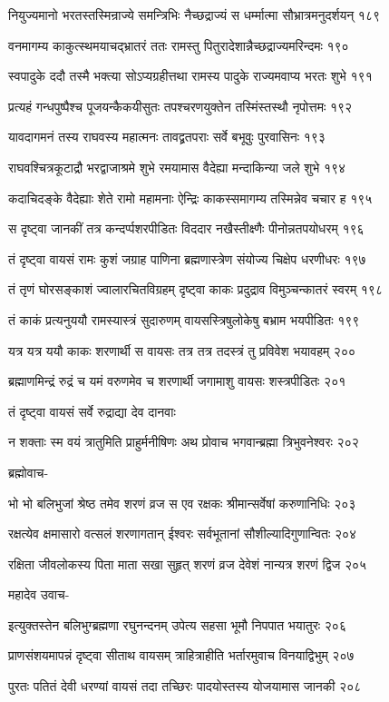 नियुज्यमानो भरतस्तस्मिन्राज्ये समन्त्रिभिः
नैच्छद्राज्यं स धर्म्मात्मा सौभ्रात्रमनुदर्शयन् १८९

वनमागम्य काकुत्स्थमयाचद्भ्रातरं ततः
रामस्तु पितुरादेशान्नैच्छद्राज्यमरिन्दमः १९०

स्वपादुके ददौ तस्मै भक्त्या सोऽप्यग्रहीत्तथा
रामस्य पादुके राज्यमवाप्य भरतः शुभे १९१

प्रत्यहं गन्धपुष्पैश्च पूजयन्कैकयीसुतः
तपश्चरणयुक्तेन तस्मिंस्तस्थौ नृपोत्तमः १९२

यावदागमनं तस्य राघवस्य महात्मनः
तावद्व्रतपराः सर्वे बभूवुः पुरवासिनः १९३

राघवश्चित्रकूटाद्रौ भरद्वाजाश्रमे शुभे
रमयामास वैदेह्या मन्दाकिन्या जले शुभे १९४

कदाचिदङ्के वैदेह्याः शेते रामो महामनाः
ऐन्द्रिः काकस्समागम्य तस्मिन्नेव चचार ह १९५

स दृष्ट्वा जानकीं तत्र कन्दर्प्पशरपीडितः
विददार नखैस्तीक्ष्णैः पीनोन्नतपयोधरम् १९६

तं दृष्ट्वा वायसं रामः कुशं जग्राह पाणिना
ब्रह्मणास्त्रेण संयोज्य चिक्षेप धरणीधरः १९७

तं तृणं घोरसङ्काशं ज्वालारचितविग्रहम्
दृष्ट्वा काकः प्रदुद्राव विमुञ्चन्कातरं स्वरम् १९८

तं काकं प्रत्यनुययौ रामस्यास्त्रं सुदारुणम्
वायसस्त्रिषुलोकेषु बभ्राम भयपीडितः १९९

यत्र यत्र ययौ काकः शरणार्थी स वायसः
तत्र तत्र तदस्त्रं तु प्रविवेश भयावहम् २००

ब्रह्माणमिन्द्रं रुद्रं च यमं वरुणमेव च
शरणार्थी जगामाशु वायसः शस्त्रपीडितः २०१

तं दृष्ट्वा वायसं सर्वे रुद्राद्या देव दानवाः

न शक्ताः स्म वयं त्रातुमिति प्राहुर्मनीषिणः
अथ प्रोवाच भगवान्ब्रह्मा त्रिभुवनेश्वरः २०२

ब्रह्मोवाच-

भो भो बलिभुजां श्रेष्ठ तमेव शरणं व्रज
स एव रक्षकः श्रीमान्सर्वेषां करुणानिधिः २०३

रक्षत्येव क्षमासारो वत्सलं शरणागतान्
ईश्वरः सर्वभूतानां सौशील्यादिगुणान्वितः २०४

रक्षिता जीवलोकस्य पिता माता सखा सुहृत्
शरणं व्रज देवेशं नान्यत्र शरणं द्विज २०५

महादेव उवाच-

इत्युक्तस्तेन बलिभुग्ब्रह्मणा रघुनन्दनम्
उपेत्य सहसा भूमौ निपपात भयातुरः २०६

प्राणसंशयमापन्नं दृष्ट्वा सीताथ वायसम्
त्राहित्राहीति भर्तारमुवाच विनयाद्विभुम् २०७

पुरतः पतितं देवी धरण्यां वायसं तदा
तच्छिरः पादयोस्तस्य योजयामास जानकी २०८


